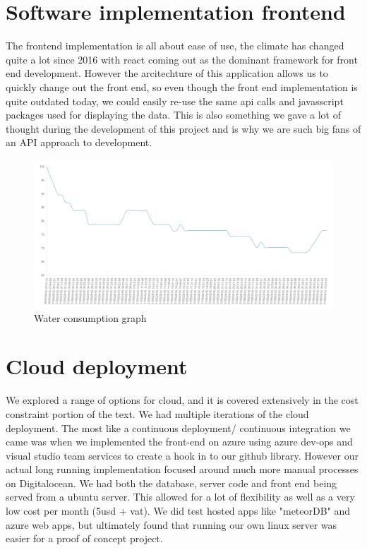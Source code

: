 \documentclass[]{uiophd}
\begin{document}
\section{Software implementation frontend}
The frontend implementation is all about ease of use, the climate has changed quite a lot since 2016 with react coming out as the dominant framework for front end development. However the arcitechture of this application allows us to quickly change out the front end, so even though the front end implementation is quite outdated today, we could easily re-use the same api calls and javasscript packages used for displaying the data. This is also something we gave a lot of thought during the development of this project and is why we are such big fans of an API approach to development. 

 \begin{figure}[h]
\caption{Water consumption graph}
\centering
\includegraphics[width=12cm]{watergraph.png}
\end{figure}

\section{Cloud deployment}
We explored a range of options for cloud, and it is covered extensively in the cost constraint portion of the text. We had multiple iterations of the cloud deployment. The most like a continuous deployment/ continuous integration we came was when we implemented the front-end on azure using azure dev-ops and visual studio team services to create a hook in to our github library. However our actual long running implementation focused around much more manual processes on Digitalocean. We had both the database, server code and front end being served from a ubuntu server. This allowed for a lot of flexibility as well as a very low cost per month (5usd + vat). We did test hosted apps like "meteorDB" and azure web apps, but ultimately found that running our own linux server was easier for a proof of concept project.
\end{document}
